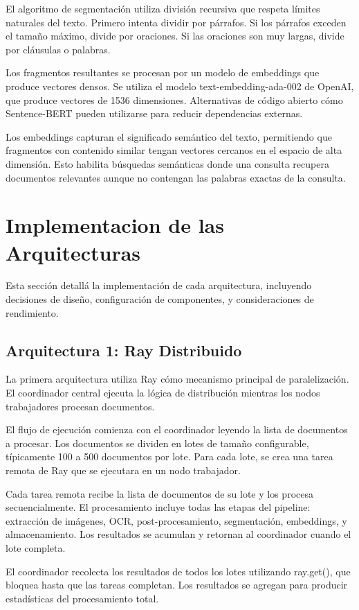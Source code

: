 \documentclass[12pt,a4paper,twoside]{book}
\begin{document}
El algoritmo de segmentación utiliza división recursiva que respeta límites naturales del texto. Primero intenta dividir por párrafos. Si los párrafos exceden el tamaño máximo, divide por oraciones. Si las oraciones son muy largas, divide por cláusulas o palabras.

Los fragmentos resultantes se procesan por un modelo de embeddings que produce vectores densos. Se utiliza el modelo text-embedding-ada-002 de OpenAI, que produce vectores de 1536 dimensiones. Alternativas de código abierto cómo Sentence-BERT pueden utilizarse para reducir dependencias externas.

Los embeddings capturan el significado semántico del texto, permitiendo que fragmentos con contenido similar tengan vectores cercanos en el espacio de alta dimensión. Esto habilita búsquedas semánticas donde una consulta recupera documentos relevantes aunque no contengan las palabras exactas de la consulta.

\section{Implementacion de las Arquitecturas}

Esta sección detallá la implementación de cada arquitectura, incluyendo decisiones de diseño, configuración de componentes, y consideraciones de rendimiento.

\subsection{Arquitectura 1: Ray Distribuido}

La primera arquitectura utiliza Ray cómo mecanismo principal de paralelización. El coordinador central ejecuta la lógica de distribución mientras los nodos trabajadores procesan documentos.

El flujo de ejecución comienza con el coordinador leyendo la lista de documentos a procesar. Los documentos se dividen en lotes de tamaño configurable, típicamente 100 a 500 documentos por lote. Para cada lote, se crea una tarea remota de Ray que se ejecutara en un nodo trabajador.

Cada tarea remota recibe la lista de documentos de su lote y los procesa secuencialmente. El procesamiento incluye todas las etapas del pipeline: extracción de imágenes, OCR, post-procesamiento, segmentación, embeddings, y almacenamiento. Los resultados se acumulan y retornan al coordinador cuando el lote completa.

El coordinador recolecta los resultados de todos los lotes utilizando ray.get(), que bloquea hasta que las tareas completan. Los resultados se agregan para producir estadísticas del procesamiento total.
\end{document}
